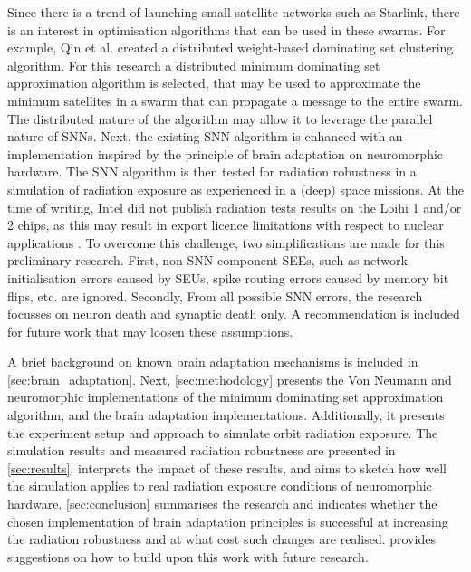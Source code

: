 Since there is a trend of launching small-satellite networks such as Starlink, there is an interest in optimisation algorithms that can be used in these swarms. For example, Qin et al. created a distributed weight-based dominating set clustering algorithm\cite{todo}. For this research a distributed minimum dominating set approximation algorithm is selected, that may be used to approximate the minimum satellites in a swarm that can propagate a message to the entire swarm. The distributed nature of the algorithm may allow it to leverage the parallel nature of SNNs.
Next, the existing SNN algorithm is enhanced with an implementation inspired by the principle of brain adaptation on neuromorphic hardware. The SNN algorithm is then tested for radiation robustness in a simulation of radiation exposure as experienced in a (deep) space missions. At the time of writing, Intel did not publish radiation tests results on the Loihi 1 and/or 2 chips, as this may result in export licence limitations with respect to nuclear applications \cite{inrc_meeting}. To overcome this challenge, two simplifications are made for this preliminary research. First, non-SNN component SEEs, such as network initialisation errors caused by SEUs, spike routing errors caused by memory bit flips, etc. are ignored. Secondly, From all possible SNN errors, the research focusses on neuron death and synaptic death only. A recommendation is included for future work that may loosen these assumptions. %

A brief background on known brain adaptation mechanisms is included in \cref{sec:brain_adaptation}. Next, \cref{sec:methodology} presents the Von Neumann and neuromorphic implementations of the minimum dominating set approximation algorithm, and the brain adaptation implementations. Additionally, it presents the experiment setup and approach to simulate orbit radiation exposure. The simulation results and measured radiation robustness are presented in \cref{sec:results}.  interprets the impact of these results, and aims to sketch how well the simulation applies to real radiation exposure conditions of neuromorphic hardware. \cref{sec:conclusion} summarises the research and indicates whether the chosen implementation of brain adaptation principles is successful at increasing the radiation robustness and at what cost such changes are realised. provides suggestions on how to build upon this work with future research.